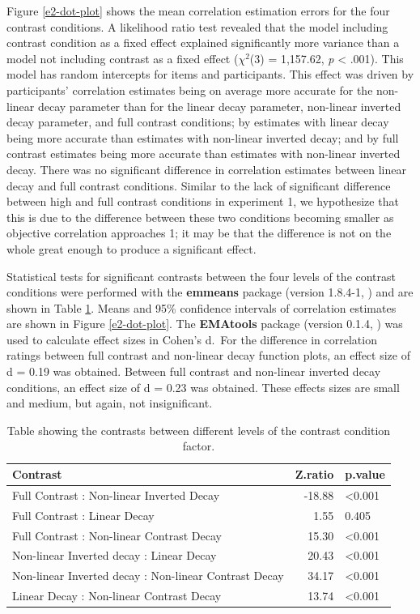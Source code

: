 \documentclass[preprint, 3p,
authoryear]{elsarticle} %
\begin{document}
Figure \ref{e2-dot-plot} shows the mean correlation estimation errors
for the four contrast conditions. A likelihood ratio test revealed that
the model including contrast condition as a fixed effect explained
significantly more variance than a model not including contrast as a
fixed effect (\(\chi^2\)(3) = 1,157.62, \emph{p} \textless{} .001). This
model has random intercepts for items and participants. This effect was
driven by participants' correlation estimates being on average more
accurate for the non-linear decay parameter than for the linear decay
parameter, non-linear inverted decay parameter, and full contrast
conditions; by estimates with linear decay being more accurate than
estimates with non-linear inverted decay; and by full contrast estimates
being more accurate than estimates with non-linear inverted decay. There
was no significant difference in correlation estimates between linear
decay and full contrast conditions. Similar to the lack of significant
difference between high and full contrast conditions in experiment 1, we
hypothesize that this is due to the difference between these two
conditions becoming smaller as objective correlation approaches 1; it
may be that the difference is not on the whole great enough to produce a
significant effect.

Statistical tests for significant contrasts between the four levels of
the contrast conditions were performed with the \textbf{emmeans} package
(version 1.8.4-1, \citealp{emmeans}) and are shown in Table
\ref{contrasts-table-e2}. Means and 95\% confidence intervals of
correlation estimates are shown in Figure \ref{e2-dot-plot}. The
\textbf{EMAtools} package (version 0.1.4, \citealp{ematools}) was used
to calculate effect sizes in Cohen's d.~For the difference in
correlation ratings between full contrast and non-linear decay function
plots, an effect size of d = 0.19 was obtained. Between full contrast
and non-linear inverted decay conditions, an effect size of d = 0.23 was
obtained. These effects sizes are small and medium, but again, not
insignificant.

\begin{table}

\caption{\label{tab:contrasts-table-e2}\label{contrasts-table-e2}Table showing the contrasts between different levels of the contrast condition factor.}
\centering
\begin{tabular}[t]{lrl}
\toprule
Contrast & Z.ratio & p.value\\
\midrule
Full Contrast : Non-linear Inverted Decay & -18.88 & <0.001\\
Full Contrast : Linear Decay & 1.55 & 0.405\\
Full Contrast : Non-linear Contrast Decay & 15.30 & <0.001\\
Non-linear Inverted decay : Linear Decay & 20.43 & <0.001\\
Non-linear Inverted decay : Non-linear Contrast Decay & 34.17 & <0.001\\
\addlinespace
Linear Decay : Non-linear Contrast Decay & 13.74 & <0.001\\
\bottomrule
\end{tabular}
\end{table}
\end{document}
